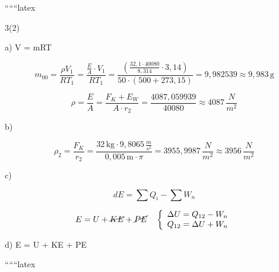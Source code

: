 
``````latex


3(2)

a) \quad \rho V = mRT

\[
m_{00} = \frac{\rho V_{1}}{R T_{1}} = \frac{\frac{E}{A} \cdot V_{1}}{R T_{1}} = \frac{\left( \frac{32,1 \cdot 40080}{8,314} \cdot 3,14 \right)}{50 \cdot (500 + 273,15)} = 9,982539 \approx 9,983 \, \text{g}
\]

\[
\rho = \frac{E}{A} = \frac{F_{K} + E_{W}}{A \cdot r_{2}} = \frac{4087,059939}{40080} \approx 4087 \, \frac{N}{m^2}
\]

b) \quad {}


\[
\rho_{2} = \frac{F_{K}}{r_{2}} = \frac{32 \, \text{kg} \cdot 9,8065 \, \frac{m}{s^2}}{0,005 \, \text{m} \cdot \pi} = 3955,9987 \, \frac{N}{m^2} \approx 3956 \, \frac{N}{m^2}
\]

c) \quad {}

\[
dE = \sum Q_{i} - \sum W_{n}
\]

\[
E = U + \cancel{KE} + \cancel{PE} \quad \left\{ \begin{array}{l}
\Delta U = Q_{12} - W_{n} \\
Q_{12} = \Delta U + W_{n}
\end{array} \right.
\]

d) \quad E = U + KE + PE

``````latex



